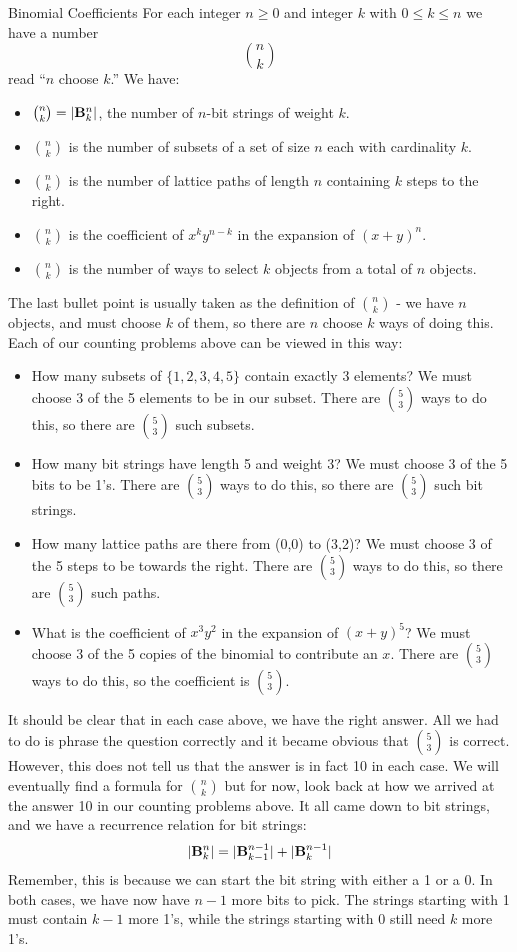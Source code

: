 \documentclass[12pt]{article}
\begin{document}
\begin{defbox}{Binomial Coefficients}
  For each integer $n \ge 0$ and integer $k$ with $0 \le k \le n$ we have a number
  \[{n\choose k}  \]
  read ``$n$ choose $k$.''  We have:
  \begin{itemize}
    \item ${n\choose k} = |\mathbf{B}^n_k|$, the number of $n$-bit strings of weight $k$.
    \item ${n \choose k}$ is the number of subsets of a set of size $n$ each with cardinality $k$.
    \item ${n \choose k}$ is the number of lattice paths of length $n$ containing $k$ steps to the right.
    \item ${n \choose k}$ is the coefficient of $x^ky^{n-k}$ in the expansion of $(x+y)^n$.
    \item ${n \choose k}$ is the number of ways to select $k$ objects from a total of $n$ objects.
  \end{itemize}
\end{defbox}

The last bullet point is usually taken as the definition of ${n \choose k}$ - we have $n$ objects, and must choose $k$ of them, so there are $n$ choose $k$ ways of doing this.  Each of our counting problems above can be viewed in this way:
\begin{itemize}
  \item How many subsets of $\{1,2,3,4,5\}$ contain exactly 3 elements?  We must choose $3$ of the 5 elements to be in our subset.  There are ${5 \choose 3}$ ways to do this, so there are ${5 \choose 3}$ such subsets.
  \item How many bit strings have length 5 and weight 3?  We must choose $3$ of the 5 bits to be 1's.  There are ${5 \choose 3}$ ways to do this, so there are ${5 \choose 3}$ such bit strings.
  \item How many lattice paths are there from (0,0) to (3,2)?  We must choose 3 of the 5 steps to be towards the right.  There are ${5 \choose 3}$ ways to do this, so there are ${5 \choose 3}$ such paths.
  \item What is the coefficient of $x^3y^2$ in the expansion of $(x+y)^5$?  We must choose 3 of the 5 copies of the binomial to contribute an $x$.  There are ${5 \choose 3}$ ways to do this, so the coefficient is ${5 \choose 3}$.
\end{itemize}

It should be clear that in each case above, we have the right answer.  All we had to do is phrase the question correctly and it became obvious that ${5 \choose 3}$ is correct.  However, this does not tell us that the answer is in fact 10 in each case.  We will eventually find a formula for ${n \choose k}$ but for now, look back at how we arrived at the answer 10 in our counting problems above.  It all came down to bit strings, and we have a recurrence relation for bit strings:
\[|\mathbf{B}^n_k| = |\mathbf{B}^{n-1}_{k-1}| + |\mathbf{B}^{n-1}_k|\]
Remember, this is because we can start the bit string with either a 1 or a 0.  In both cases, we have now have $n-1$ more bits to pick.  The strings starting with 1 must contain $k-1$ more 1's, while the strings starting with 0 still need $k$ more 1's.
\end{document}
